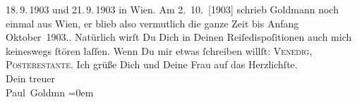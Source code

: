 \begin{ledgroupsized}[t]{13cm}
{{{                     18. 9. 1903 und
                     21. 9. 1903 in
                     Wien. Am 2. 10. [1903] schrieb Goldmann noch einmal aus Wien, er
                  blieb also vermutlich die ganze Zeit bis Anfang Oktober 1903.}}}\label{K_L03386-3h}. Natürlich wirſt Du Dich in Deinen
               Reiſedispoſitionen auch mich keineswegs ſtören laſſen. Wenn Du mir etwas ſchreiben
               willſt: \textsc{Venedig, Poste}\textsc{restante}.\pend
           \pstart
           Ich grüße Dich und Deine Frau auf das Herzlichſte. {\\[\baselineskip]}Dein treuer {\\[\baselineskip]}\spacefill\mbox{Paul Goldmn}\pend
           \leftskip=0em{}
         
         \endnumbering{}\end{ledgroupsized}\begin{anhang}\end{anhang}\newcommand{\dateiname}{L03386}\newcommand{\titel}{Paul Goldmann an Arthur Schnitzler, 7. 9. 1903}\newcommand{\editorInnen}{Martin Anton Müller und Laura Untner}
      